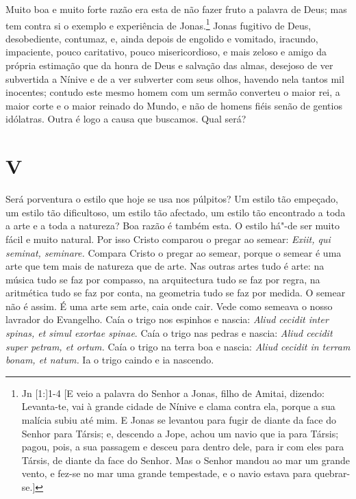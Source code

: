 Muito boa e muito forte razão era esta de não fazer fruto a
palavra de Deus; mas tem contra si o exemplo e experiência de
Jonas.\footnote{Jn [1:]1-4 [E veio a palavra do Senhor a Jonas, filho de Amitai, dizendo: Levanta-te, vai à grande cidade de Nínive e clama contra ela, porque a sua malícia subiu até mim. E Jonas se levantou para fugir de diante da face do Senhor para Társis; e, descendo a Jope, achou um navio que ia para Társis; pagou, pois, a sua passagem e desceu para dentro dele, para ir com eles para Társis, de diante da face do Senhor. Mas o Senhor mandou ao mar um grande vento, e fez-se no mar uma grande tempestade, e o navio estava para quebrar-se.]} Jonas fugitivo de Deus, desobediente, contumaz, e, ainda depois
de engolido e vomitado, iracundo, impaciente, pouco caritativo, pouco
misericordioso, e mais zeloso e amigo da própria estimação que da honra
de Deus e salvação das almas, desejoso de ver subvertida a Nínive e de a
ver subverter com seus olhos, havendo nela tantos mil inocentes; contudo
este mesmo homem com um sermão converteu o maior rei, a maior corte e o
maior reinado do Mundo, e não de homens fiéis senão de gentios idólatras. Outra é logo a causa que buscamos. Qual será?

\section*{V}

Será porventura o estilo que hoje se usa nos púlpitos? Um estilo tão
empeçado, um estilo tão dificultoso, um estilo tão afectado, um estilo
tão encontrado a toda a arte e a toda a natureza? Boa razão é também
esta. O estilo há"-de ser muito fácil e muito natural. Por isso Cristo
comparou o pregar ao semear: \emph{Exiit, qui seminat, seminare.}
Compara Cristo o pregar ao semear, porque o semear é uma arte que tem
mais de natureza que de arte. Nas outras artes tudo é arte: na música
tudo se faz por compasso, na arquitectura tudo se faz por regra, na
aritmética tudo se faz por conta, na geometria tudo se faz por medida.
O semear não é assim. É uma arte sem arte, caia onde cair. Vede como
semeava o nosso lavrador do Evangelho. Caía o trigo nos espinhos e
nascia: \emph{Aliud cecidit inter spinas, et simul exortae spinae}.
Caía o trigo nas pedras e nascia: \emph{Aliud cecidit super petram,
et ortum.} Caía o trigo na terra boa e nascia: \emph{Aliud cecidit
in terram bonam, et natum.} Ia o trigo caindo e ia nascendo.

